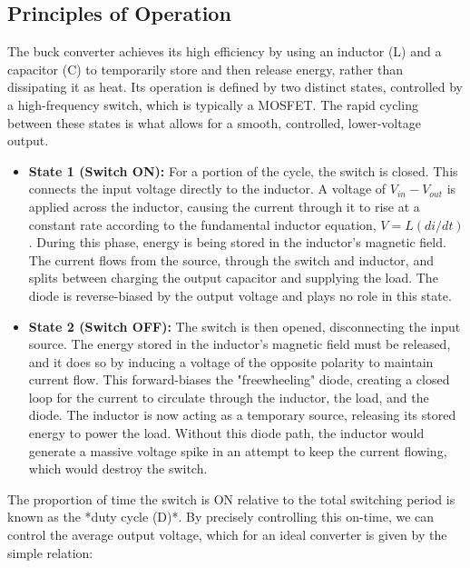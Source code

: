\documentclass[12pt, a4paper]{article}
\begin{document}
\subsection{Principles of Operation}

The buck converter achieves its high efficiency by using an inductor (L) and a capacitor (C) to temporarily store and then release energy, rather than dissipating it as heat. Its operation is defined by two distinct states, controlled by a high-frequency switch, which is typically a MOSFET. The rapid cycling between these states is what allows for a smooth, controlled, lower-voltage output.







\begin{itemize}

    \item \textbf{State 1 (Switch ON):} For a portion of the cycle, the switch is closed. This connects the input voltage directly to the inductor. A voltage of $V_{in} - V_{out}$ is applied across the inductor, causing the current through it to rise at a constant rate according to the fundamental inductor equation, $V = L(di/dt)$. During this phase, energy is being stored in the inductor's magnetic field. The current flows from the source, through the switch and inductor, and splits between charging the output capacitor and supplying the load. The diode is reverse-biased by the output voltage and plays no role in this state.

    \item \textbf{State 2 (Switch OFF):} The switch is then opened, disconnecting the input source. The energy stored in the inductor's magnetic field must be released, and it does so by inducing a voltage of the opposite polarity to maintain current flow. This forward-biases the "freewheeling" diode, creating a closed loop for the current to circulate through the inductor, the load, and the diode. The inductor is now acting as a temporary source, releasing its stored energy to power the load. Without this diode path, the inductor would generate a massive voltage spike in an attempt to keep the current flowing, which would destroy the switch.

\end{itemize}



The proportion of time the switch is ON relative to the total switching period is known as the *duty cycle (D)*. By precisely controlling this on-time, we can control the average output voltage, which for an ideal converter is given by the simple relation:
\end{document}
